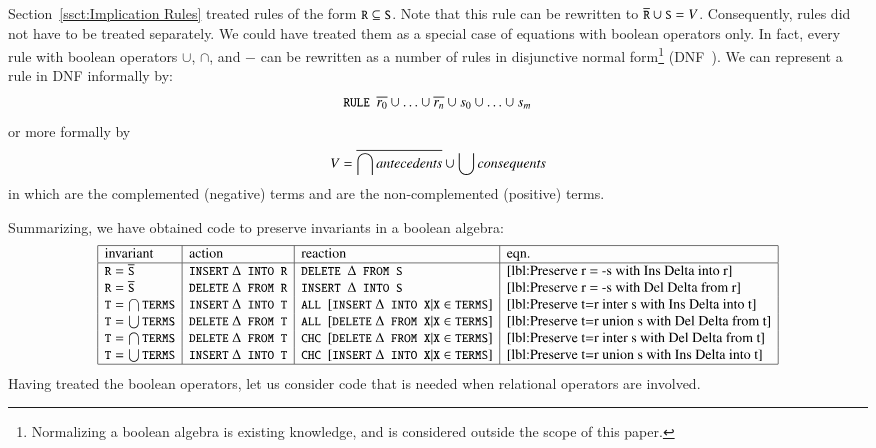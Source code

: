 \documentclass{elsarticle}
\begin{document}
	Section~\ref{ssct:Implication Rules} treated rules of the form $\text{\tt\small R}\subseteq\text{\tt\small S}$.
	Note that this rule can be rewritten to $\overline{\text{\tt\small R}}\cup\text{\tt\small S}=V$.
	Consequently, rules did not have to be treated separately.
	We could have treated them as a special case of equations with boolean operators only.
	In fact, every rule with boolean operators $\cup$, $\cap$, and $-$ can be rewritten as a number of rules in disjunctive normal form\footnote{%
	Normalizing a boolean algebra is existing knowledge, and is considered outside the scope of this paper.} (DNF~\cite{davey1990}).
	We can represent a rule in DNF informally by:
\begin{eqnarray}
\text{\tt\small RULE }\overline{r_0}\cup\ldots\cup\overline{r_n}\cup s_0\cup\ldots\cup s_m
\end{eqnarray}
	or more formally by
\begin{eqnarray}
V=\overline{\bigcap\text{\em antecedents\/}}\cup\bigcup\text{\em consequents\/}
\end{eqnarray}
	in which  are the complemented (negative) terms and  are the non-complemented (positive) terms.

	Summarizing, we have obtained code to preserve invariants in a boolean algebra:
\[\begin{array}{|l|l|l|l|}
\hline
\text{invariant}&\text{action}&\text{reaction}&\text{eqn.}\\ \hline
\code{R}=\cmpl{\code{S}}&\code{INSERT}\ \Delta\code{ INTO R}&\code{DELETE }\Delta\code{ FROM S}&\ref{lbl:Preserve r = -s with Ins Delta into r}\\
\code{R}=\cmpl{\code{S}}&\code{DELETE}\ \Delta\code{ FROM R}&\code{INSERT }\Delta\code{ INTO S}&\ref{lbl:Preserve r = -s with Del Delta from r}\\
\code{T}=\bigcap\code{TERMS}&\code{INSERT}\ \Delta\code{ INTO T}&\code{ALL }[\code{INSERT}\ \Delta\code{ INTO X}|\code{X}\in\code{TERMS}]&\ref{lbl:Preserve t=r inter s with Ins Delta into t}\\
\code{T}=\bigcup\code{TERMS}&\code{DELETE}\ \Delta\code{ FROM T}&\code{ALL }[\code{DELETE}\ \Delta\code{ FROM X}|\code{X}\in\code{TERMS}]&\ref{lbl:Preserve t=r union s with Del Delta from t}\\
\code{T}=\bigcap\code{TERMS}&\code{DELETE}\ \Delta\code{ FROM T}&\code{CHC }[\code{DELETE}\ \Delta\code{ FROM X}|\code{X}\in\code{TERMS}]&\ref{lbl:Preserve t=r inter s with Del Delta from t}\\
\code{T}=\bigcup\code{TERMS}&\code{INSERT}\ \Delta\code{ INTO T}&\code{CHC }[\code{INSERT}\ \Delta\code{ INTO X}|\code{X}\in\code{TERMS}]&\ref{lbl:Preserve t=r union s with Ins Delta into t}\\ \hline
\end{array}\]
	Having treated the boolean operators, let us consider code that is needed when relational operators are involved.
\end{document}
